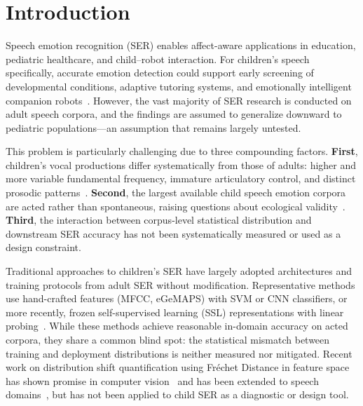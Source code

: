 
\section{Introduction}
\label{sec:introduction}

Speech emotion recognition (SER) enables affect-aware applications in
education, pediatric healthcare, and child--robot interaction. For children's
speech specifically, accurate emotion detection could support early screening
of developmental conditions, adaptive tutoring systems, and emotionally
intelligent companion robots~\cite{batliner2011fau}. However, the vast majority
of SER research is conducted on adult speech corpora, and the findings are
assumed to generalize downward to pediatric populations---an assumption that
remains largely untested.

This problem is particularly challenging due to three compounding factors.
\textbf{First}, children's vocal productions differ systematically from those
of adults: higher and more variable fundamental frequency, immature
articulatory control, and distinct prosodic patterns~\cite{lee1999acoustics}.
\textbf{Second}, the largest available child speech emotion corpora are acted
rather than spontaneous, raising questions about ecological
validity~\cite{batliner2011fau,schuller2009interspeech}. \textbf{Third}, the
interaction between corpus-level statistical distribution and downstream SER
accuracy has not been systematically measured or used as a design constraint.

Traditional approaches to children's SER have largely adopted architectures and
training protocols from adult SER without modification. Representative methods
use hand-crafted features (MFCC, eGeMAPS) with SVM or CNN classifiers, or more
recently, frozen self-supervised learning (SSL) representations with linear
probing~\cite{wagner2023dawn,chen2022wavlm}. While these methods achieve
reasonable in-domain accuracy on acted corpora, they share a common blind spot:
the statistical mismatch between training and deployment distributions is
neither measured nor mitigated. Recent work on distribution shift
quantification using Fr\'{e}chet Distance in feature space has shown promise in
computer vision~\cite{heusel2017gans} and has been extended to speech
domains~\cite{le2024dist}, but has not been applied to child SER as a
diagnostic or design tool.

